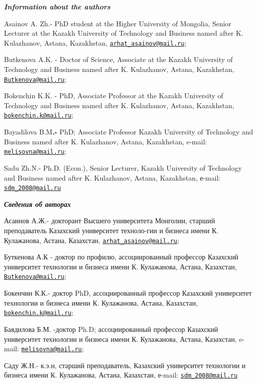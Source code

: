 \begin{authorinfo}
\emph{{\bfseries Information about the authors}}

Asainov A. Zh.- PhD student at the Higher University of Mongolia, Senior
Lecturer at the Kazakh University of Technology and Business named after
K. Kulazhanov, Astana, Kazakhstan,
\href{mailto:arhat_asainov@mail.ru}{\nolinkurl{arhat\_asainov@mail.ru}};

Butkenova A.K. - Doctor of Science, Associate at the Kazakh University
of Technology and Business named after K. Kulazhanov, Astana,
Kazakhstan,
\href{mailto:Butkenova@mail.ru}{\nolinkurl{Butkenova@mail.ru}};

Bokenchin K.K. - PhD, Associate Professor at the Kazakh University of
Technology and Business named after K. Kulazhanov, Astana, Kazakhstan,
\href{mailto:bokenchin.k@mail.ru}{\nolinkurl{bokenchin.k@mail.ru}};

Bayadilova B.M{\bfseries .-} PhD; Associate Professor Kazakh University of
Technology and Business named after K. Kulazhanov, Astana, Kazakhstan,
e-mail: \href{mailto:melisovna@mail.ru}{\nolinkurl{melisovna@mail.ru}};

Sadu Zh.N.- Ph.D. (Econ.), Senior Lecturer, Kazakh University of
Technology and Business named after K. Kulazhanov, Astana, Kazakhstan,
е-mail: \href{mailto:sdm_2008@mail.ru}{\nolinkurl{sdm\_2008@mail.ru}}

\emph{{\bfseries Сведения об авторах}}

Асаинов А.Ж.- докторант Высшего университета Монголии, старший
преподаватель Казахский университет техноло-гии и бизнеса имени К.
Кулажанова, Астана, Казахстан,
\href{mailto:arhat_asainov@mail.ru}{\nolinkurl{arhat\_asainov@mail.ru}};

Буткенова А.К - доктор по профилю, ассоциированный профессор Казахский
университет технологии и бизнеса имени К. Кулажанова, Астана, Казахстан,
\href{mailto:Butkenova@mail.ru}{\nolinkurl{Butkenova@mail.ru}};

Бокенчин К.К.- доктор PhD, ассоциированный профессор Казахский
университет технологии и бизнеса имени К. Кулажанова, Астана, Казахстан,
\href{mailto:bokenchin.k@mail.ru}{\nolinkurl{bokenchin.k@mail.ru}};

Баядилова Б.М. -доктор Ph.D; ассоциированный профессор Казахский
университет технологии и бизнеса имени К. Кулажанова, Астана, Казахстан,
e-mail: \href{mailto:melisovna@mail.ru}{\nolinkurl{melisovna@mail.ru}};

Саду Ж.Н.- к.э.н, старший преподаватель, Казахский университет
технологии и бизнеса имени К. Кулажанова, Астана, Казахстан, е-mail:
\href{mailto:sdm_2008@mail.ru}{\nolinkurl{sdm\_2008@mail.ru}}
\end{authorinfo}
